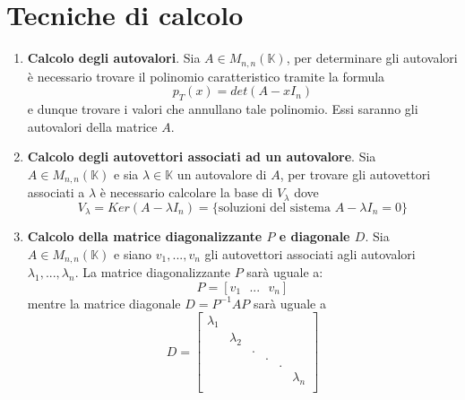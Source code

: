 \documentclass[12pt,a4paper,oneside]{book}
\begin{document}
\newpage
			  \section{Tecniche di calcolo}
			  
\begin{enumerate}
\item \textbf{Calcolo degli autovalori}. \linebreak
	  Sia $A\in M_{n, n}(\mathbb{K})$, per determinare gli autovalori è necessario trovare il polinomio
	  caratteristico tramite la formula $$p_T(x) = det(A-xI_n)$$ e dunque trovare i valori che annullano 
	  tale polinomio. Essi saranno gli autovalori della matrice $A$.
	
\item \textbf{Calcolo degli autovettori associati ad un autovalore}. \linebreak
	  Sia $A\in M_{n, n}(\mathbb{K})$ e sia $\lambda\in\mathbb{K}$ un autovalore di $A$, per trovare gli
	  autovettori associati a $\lambda$ è necessario calcolare la base di $V_{\lambda}$ dove
	  $$V_{\lambda} = Ker(A-\lambda I_n) = \{\text{soluzioni del sistema } A-\lambda I_n = 0\}$$
	
\item \textbf{Calcolo della matrice diagonalizzante $P$ e diagonale $D$}. \linebreak
	  Sia $A\in M_{n, n}(\mathbb{K})$ e siano $v_1, ..., v_n$ gli autovettori associati agli autovalori
	  $\lambda_1, ..., \lambda_n$.\hfill \break
	  La matrice diagonalizzante $P$ sarà uguale a: $$P = [v_1\text{ }...\text{ }v_n]$$
	  mentre la matrice diagonale $D= P^{-1}AP$ sarà uguale a
	  $$D=\begin{bmatrix}
	  \lambda_1 \\
	    & \lambda_2\\
	    &   &  .\\
	    &   &   &   .\\
	    &   &   &   &   .\\
	    &   &   &   &   & \lambda_n \\
	  \end{bmatrix}$$
	
\end{enumerate}





\end{document}
